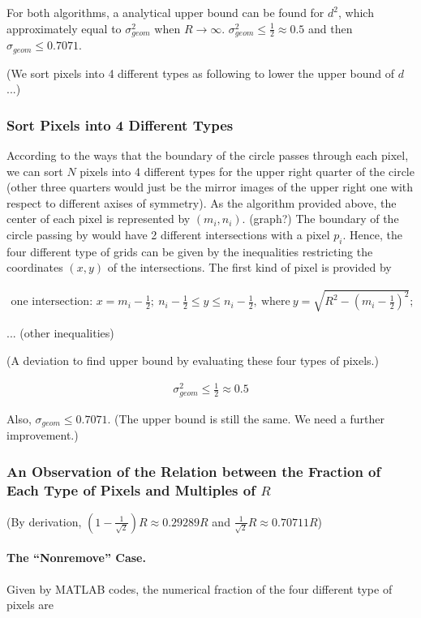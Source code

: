 \documentclass[letterpaper]{article}
\numberwithin{equation}{section} %
\numberwithin{figure}{section} %
\numberwithin{table}{section} %
\begin{document}
For both algorithms, a analytical upper bound can be found for $d^2$, which approximately equal to $\sigma_{geom}^2$ when $R \rightarrow \infty$. $\sigma_{geom}^2 \leq \frac{1}{2} \approx 0.5$ and then $\sigma_{geom} \leq 0.7071$.

(We sort pixels into 4 different types as following to lower the upper bound of $d$ ...)

\subsubsection{Sort Pixels into 4 Different Types}
According to the ways that the boundary of the circle passes through each pixel, we can sort $N$ pixels into 4 different types for the upper right quarter of the circle (other three quarters would just be the mirror images of the upper right one with respect to different axises of symmetry). As the algorithm provided above, the center of each pixel is represented by $(m_i, n_i)$. (graph?) The boundary of the circle passing by would have 2 different intersections with a pixel $p_i$. Hence, the four different type of grids can be given by the inequalities restricting the coordinates $(x,y)$ of the intersections. The first kind of pixel is provided by  

\begin{align} 
\text{one intersection: } x=m_i-\frac{1}{2}; \ n_i-\frac{1}{2}\leq y \leq n_i-\frac{1}{2}, \ \text{where} \ y=\sqrt{R^2-(m_i-\frac{1}{2})^2};
\end{align}

... (other inequalities)

(A deviation to find upper bound by evaluating these four types of pixels.) 

\begin{align} 
\sigma_{geom}^2 \leq \frac{1}{2} \approx 0.5
\end{align}

Also, $\sigma_{geom} \leq 0.7071$. (The upper bound is still the same. We need a further improvement.)

\subsubsection{An Observation of the Relation between the Fraction of Each Type of Pixels and Multiples of $R$}

(By derivation, $(1-\frac{1}{\sqrt{2}})R \approx 0.29289 R$ and $\frac{1}{\sqrt{2}}R \approx 0.70711 R$)

\paragraph{The \enquote{Nonremove} Case.}
Given by MATLAB codes, the numerical fraction of the four different type of pixels are 
\end{document}
